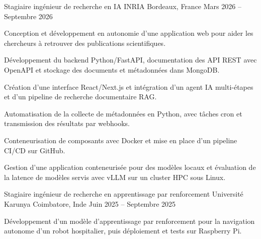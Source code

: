
\begin{cventries}
  \cventry
    {Stagiaire ingénieur de recherche en IA}
    {INRIA}
    {Bordeaux, France}
    {Mars 2026 -- Septembre 2026}
    {
      \begin{cvitems}
        \item {Conception et développement en autonomie d’une application web pour aider les chercheurs à retrouver des publications scientifiques.}
        \item {Développement du backend Python/FastAPI, documentation des API REST avec OpenAPI et stockage des documents et métadonnées dans MongoDB.}
        \item {Création d’une interface React/Next.js et intégration d’un agent IA multi-étapes et d’un pipeline de recherche documentaire RAG.}
        \item {Automatisation de la collecte de métadonnées en Python, avec tâches cron et transmission des résultats par webhooks.}
        \item {Conteneurisation de composants avec Docker et mise en place d’un pipeline CI/CD sur GitHub.}
        \item {Gestion d’une application conteneurisée pour des modèles locaux et évaluation de la latence de modèles servis avec vLLM sur un cluster HPC sous Linux.}
      \end{cvitems}
    }

  \cventry
    {Stagiaire ingénieur de recherche en apprentissage par renforcement}
    {Université Karunya}
    {Coimbatore, Inde}
    {Juin 2025 -- Septembre 2025}
    {
      \begin{cvitems}
        \item {Développement d’un modèle d’apprentissage par renforcement pour la navigation autonome d’un robot hospitalier, puis déploiement et tests sur Raspberry Pi.}
      \end{cvitems}
    }
\end{cventries}
